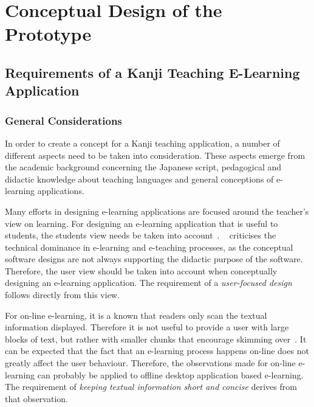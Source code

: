 
\chapter{Conceptual Design of the Prototype}
\label{chap:conceptualdesignofKanjicoach}

\section{Requirements of a Kanji Teaching E-Learning Application}
\label{sec:concept:requirements}

\subsection{General Considerations}
\label{sec:concept:generalconsiderations}

In order to create a concept for a Kanji teaching application,
a number of different aspects need to be taken into consideration.
These aspects emerge from the academic background concerning the Japanese script,
pedagogical and didactic knowledge about teaching languages and general
conceptions of e-learning applications.

Many efforts in designing e-learning applications are focused around the
teacher's view on learning. For designing an e-learning application that
is useful to students, the students view needs be taken into 
account~. 
~\citeyear{Ivashin2009} criticises the technical 
dominance in e-learning and e-teaching processes, as the conceptual software
designs are not always supporting the didactic purpose of the software.
Therefore, the user view should be taken into account when conceptually designing
an e-learning application.
The requirement of a \emph{user-focused design} follows directly from this view.

For on-line e-learning, it is a known that readers only scan the textual 
information displayed. Therefore it is not useful to provide a user with 
large blocks of text, but rather with smaller chunks that encourage 
skimming over~. It can be expected that the fact
that an e-learning process happens on-line does not greatly affect the user 
behaviour. Therefore, the observations made for on-line e-learning can
probably be applied to offline desktop application based e-learning.
The requirement of \emph{keeping textual information short and concise} derives
from that observation.

